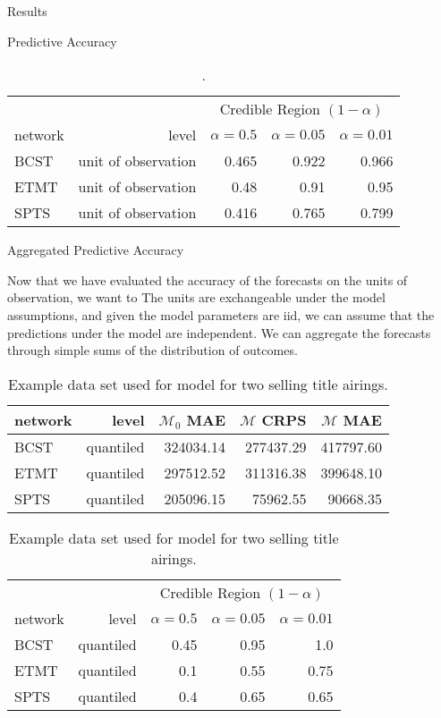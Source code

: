 \begin{chapter}{Results}
\begin{section}{Predictive Accuracy}
    \begin{table}[h!]
      \centering
        \begin{tabular}{lrrrr}
          & & \multicolumn{3}{c}{Credible Region $(1 - \alpha)$} \\
          network & level & $\alpha = 0.5$ & $\alpha = 0.05$ & $\alpha = 0.01$ \\
          \hline
          BCST & unit of observation & 0.465 & 0.922 & 0.966 \\
          ETMT & unit of observation & 0.48 & 0.91 & 0.95  \\
          SPTS & unit of observation & 0.416 & 0.765 & 0.799 \\
        \end{tabular}
      \caption{.}\label{tab:unitcr}
    \end{table}

  \end{section}

  \begin{section}{Aggregated Predictive Accuracy}

    Now that we have evaluated the accuracy of the forecasts on the units of observation,
    we want to
    The units are exchangeable under the model assumptions, and given the model parameters are iid,
    we can assume that the predictions under the model are independent. We can aggregate
    the forecasts through simple sums of the distribution of outcomes.


    \begin{table}[h!]
      \centering
        \begin{tabular}{lrrrr}
          network & level & $\mathcal{M}_0$ MAE & $\mathcal{M}$ CRPS & $\mathcal{M}$ MAE \\
          \hline
          BCST & quantiled & 324034.14 & 277437.29 & 417797.60 \\
          ETMT & quantiled & 297512.52 & 311316.38 & 399648.10 \\
          SPTS & quantiled & 205096.15 & 75962.55 & 90668.35
        \end{tabular}
      \caption{Example data set used for model for two selling title airings.}\label{tab:quantileerror}
    \end{table}

    \begin{table}[h!]
      \centering
        \begin{tabular}{lrrrr}
          & & \multicolumn{3}{c}{Credible Region $(1 - \alpha)$} \\
          network & level & $\alpha = 0.5$ & $\alpha = 0.05$ & $\alpha = 0.01$ \\
          \hline
          BCST & quantiled & 0.45 & 0.95 & 1.0 \\
          ETMT & quantiled & 0.1 & 0.55  & 0.75 \\
          SPTS & quantiled & 0.4 & 0.65 & 0.65 \\
        \end{tabular}
      \caption{Example data set used for model for two selling title airings.}\label{tab:quantilecr}
    \end{table}


\end{section}
\end{chapter}
